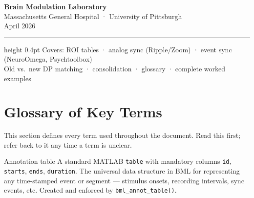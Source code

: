 \documentclass[11pt, a4paper]{article}
\begin{document}

\begin{titlepage}
\vspace*{7cm}
\begin{center}
{\large\bfseries\color{bmlblue} Brain Modulation Laboratory}\\[4pt]
{\normalsize Massachusetts General Hospital · University of Pittsburgh}\\[12pt]
{\small\color{gray} April 2026}\\[24pt]
\hrule height 0.4pt
\vspace{8pt}
{\small\color{gray}
Covers: ROI tables · analog sync (Ripple/Zoom) · event sync (NeuroOmega, Psychtoolbox)\\
Old vs.\ new DP matching · consolidation · glossary · complete worked examples}
\end{center}
\end{titlepage}

\tableofcontents
\newpage

\section{Glossary of Key Terms}
\label{sec:glossary}

This section defines every term used throughout the document. Read this first; refer back to it any time a term is unclear.

\begin{glossentry}{Annotation table}
A standard MATLAB \texttt{table} with mandatory columns \texttt{id}, \texttt{starts}, \texttt{ends}, \texttt{duration}. The universal data structure in BML for representing any time-stamped event or segment --- stimulus onsets, recording intervals, sync events, etc. Created and enforced by \texttt{bml\_annot\_table()}.
\end{glossentry}
\end{document}
